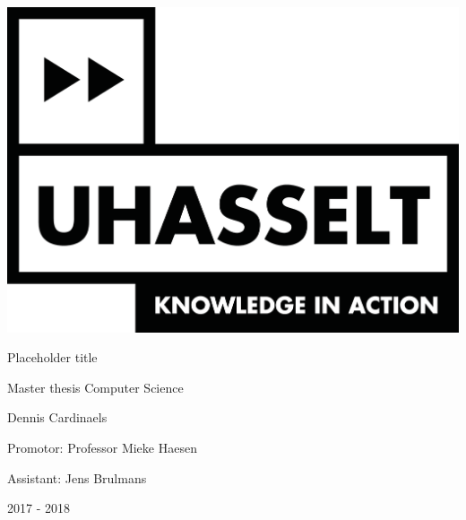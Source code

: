 \documentclass{article}
\begin{document}
	\begin{titlepage}

		\centering
		
		
		\includegraphics[scale=0.5]{logo_uhasselt}		
		\vspace{1cm}
		
		\Huge Placeholder title
		\vspace{0.4cm}
		
		\large Master thesis Computer Science
		\vspace{1cm}
		
		\LARGE Dennis Cardinaels
		\vspace{1cm}
		
		\large Promotor: Professor Mieke Haesen
		\vspace{0.2cm}
		
		Assistant: Jens Brulmans
		
		\vspace{1.2cm}
		
		
		\Large 2017 - 2018
		
	\end{titlepage}

	\cleardoublepage
	
	
	
	
	
	\tableofcontents
	\newpage
	
	
	
	
	

	

	

	

	

	
	
	
	
\end{document}
